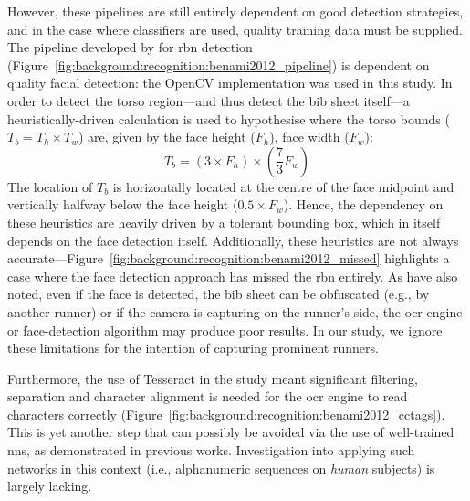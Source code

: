 However, these pipelines are still entirely dependent on good detection strategies, and in the case where classifiers are used, quality training data must be supplied. The pipeline developed by \citet{Benami:2012jf} for \gls{rbn} detection (Figure~\ref{fig:background:recognition:benami2012_pipeline}) is dependent on quality facial detection: the OpenCV implementation \citep{Lienhart:2002uo} was used in this study. In order to detect the torso region---and thus detect the bib sheet itself---a heuristically-driven calculation is used to hypothesise where the torso bounds ($T_{b} = T_{h} \times T_{w}$) are, given by the face height ($F_{h}$), face width ($F_{w}$):
\begin{equation*}
  T_{b} = (3 \times F_{h}) \times (\frac{7}{3} F_{w})
\end{equation*}
The location of $T_{b}$ is horizontally located at the centre of the face midpoint and vertically halfway below the face height ($0.5 \times F_{w}$). Hence, the dependency on these heuristics are heavily driven by a tolerant bounding box, which in itself depends on the face detection itself. Additionally, these heuristics are not always accurate---Figure~\ref{fig:background:recognition:benami2012_missed} highlights a case where the face detection approach has missed the \gls{rbn} entirely. As \citet{Fu:2015by} have also noted, even if the face is detected, the bib sheet can be obfuscated (e.g., by another runner) or if the camera is capturing on the runner's side, the \gls{ocr} engine or face-detection algorithm may produce poor results. In our study, we ignore these limitations for the intention of capturing prominent runners.

Furthermore, the use of Tesseract in the study meant significant filtering, separation and character alignment is needed for the \gls{ocr} engine to read characters correctly (Figure~\ref{fig:background:recognition:benami2012_cctags}). This is yet another step that can possibly be avoided via the use of well-trained \glspl{nn}, as demonstrated in previous works. Investigation into applying such networks in this context (i.e., alphanumeric sequences on \textit{human} subjects) is largely lacking.

\vspace*{\fill}


